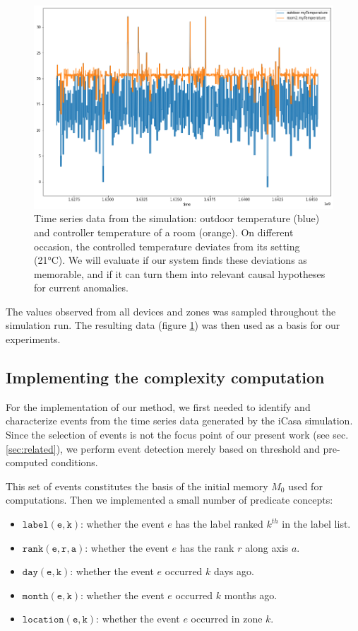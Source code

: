 \documentclass[conference]{IEEEtran}
\begin{document}
\begin{figure}[ht]
  \includegraphics[width=\linewidth]{figures/ts_example}
  \caption{Time series data from the simulation: outdoor temperature (blue) and
controller temperature of a room (orange). On different occasion, the
    controlled temperature deviates from its setting (21°C). We will evaluate if
our system finds these deviations as memorable, and if it can turn them into relevant causal
hypotheses for current anomalies.}
  \label{fig:ts_example}
\end{figure}

The values observed from all devices and zones was sampled throughout
the simulation run. The resulting data (figure
\ref{fig:ts_example}) was then used as a basis for our experiments.


\subsection{Implementing the complexity computation}

For the implementation of our method, we first needed to identify and
characterize events from the time series data generated by the iCasa simulation.
Since the selection of events is not the focus point of our present work (see sec.
\ref{sec:related}), we perform event detection merely based on threshold and pre-computed conditions.

This set of events constitutes the basis of the initial memory $M_0$ used
for computations.
Then we implemented a small number of predicate concepts:
\begin{itemize}
\item $\mathtt{label(e, k)}$: whether the event $e$ has the label ranked
$k^{th}$ in the label list.
\item $\mathtt{rank(e, r, a)}$: whether the event $e$ has the rank $r$
along axis $a$.
\item $\mathtt{day(e, k)}$: whether the event $e$ occurred $k$ days ago.
\item $\mathtt{month(e, k)}$: whether the event $e$ occurred $k$ months
        ago.
\item $\mathtt{location(e, k)}$: whether the event $e$ occurred in zone
        $k$.
\end{itemize}
\end{document}
